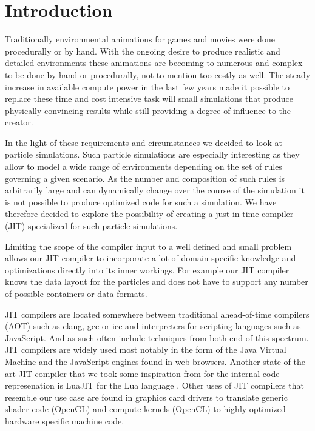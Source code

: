 \section{Introduction}\label{sec:intro}

Traditionally environmental animations for games and movies were done procedurally or by hand. With the ongoing desire to produce realistic and detailed environments these animations are becoming to numerous and complex to be done by hand or procedurally, not to mention too costly as well. The steady increase in available compute power in the last few years made it possible to replace these time and cost intensive task will small simulations that produce physically convincing results while still providing a degree of influence to the creator.

In the light of these requirements and circumstances we decided to look at particle simulations. Such particle simulations are especially interesting as they allow to model a wide range of environments depending on the set of rules governing a given scenario. As the number and composition of such rules is arbitrarily large and can dynamically change over the course of the simulation it is not possible to produce optimized code for such a simulation. We have therefore decided to explore the possibility of creating a just-in-time compiler (JIT) specialized for such particle simulations.

Limiting the scope of the compiler input to a well defined and small problem allows our JIT compiler to incorporate a lot of domain specific knowledge and optimizations directly into its inner workings. For example our JIT compiler knows the data layout for the particles and does not have to support any number of possible containers or data formats.

JIT compilers are located somewhere between traditional ahead-of-time compilers (AOT) such as clang, gcc or icc and interpreters for scripting languages such as JavaScript. And as such often include techniques from both end of this spectrum. JIT compilers are widely used most notably in the form of the Java Virtual Machine and the JavaScript engines found in web browsers. Another state of the art JIT compiler that we took some inspiration from for the internal code represenation is LuaJIT for the Lua language \cite{Pall:14}. Other uses of JIT compilers that resemble our use case are found in graphics card drivers to translate generic shader code (OpenGL) and compute kernels (OpenCL) to highly optimized hardware specific machine code.


